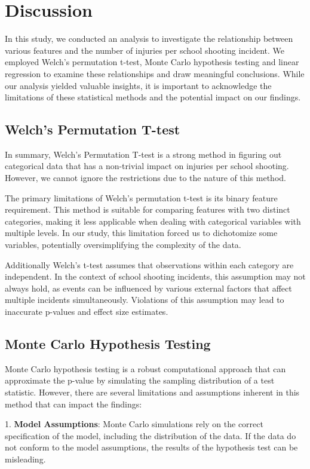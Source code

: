 \documentclass[12pt]{article}
\numberwithin{figure}{section}
\begin{document}
\section{Discussion}

In this study, we conducted an analysis to investigate the relationship between various features and the number of injuries per school shooting incident. We employed Welch's permutation t-test, Monte Carlo hypothesis testing and linear regression to examine these relationships and draw meaningful conclusions. While our analysis yielded valuable insights, it is important to acknowledge the limitations of these statistical methods and the potential impact on our findings.

\subsection{Welch's Permutation T-test}

In summary, Welch's Permutation T-test is a strong method in figuring out categorical data that has a non-trivial impact on injuries per school shooting. However, we cannot ignore the restrictions due to the nature of this method.

The primary limitations of Welch's permutation t-test is its binary feature requirement. This method is suitable for comparing features with two distinct categories, making it less applicable when dealing with categorical variables with multiple levels. In our study, this limitation forced us to dichotomize some variables, potentially oversimplifying the complexity of the data. 

Additionally Welch's t-test assumes that observations within each category are independent. In the context of school shooting incidents, this assumption may not always hold, as events can be influenced by various external factors that affect multiple incidents simultaneously. Violations of this assumption may lead to inaccurate p-values and effect size estimates.


\subsection{Monte Carlo Hypothesis Testing}
Monte Carlo hypothesis testing is a robust computational approach that can approximate the p-value by simulating the sampling distribution of a test statistic. However, there are several limitations and assumptions inherent in this method that can impact the findings:

1. \textbf{Model Assumptions}: Monte Carlo simulations rely on the correct specification of the model, including the distribution of the data. If the data do not conform to the model assumptions, the results of the hypothesis test can be misleading.
\end{document}
